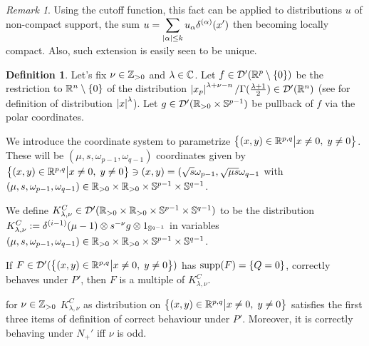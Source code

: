 \documentclass[10pt]{article} %
\newcommand{\D}{\mathcal{D}}
\theoremstyle{definition}
\newtheorem{mydef}{Definition}[section]
\theoremstyle{remark}
\newtheorem*{remark}{Remark}
\begin{document}
\begin{remark}
	Using the cutoff function, this fact can be applied to distributions $u$ of non-compact support, the sum 
	$u=\sum_{\myabs{\alpha}\leq k}u_{\alpha}\delta^{(\alpha)}(x')$
	then becoming locally compact. Also, such extension is easily seen to be unique.
\end{remark}
\begin{mydef}
	Let's fix $\nu\in\mathbb{Z}_{>0}$ and $\lambda\in\mathbb{C}$. Let $f\in\D'(\R^p\setminus\left\{ 0 \right\})$ be the restriction to 
	$\mathbb{R}^n\setminus\left\{ 0 \right\}$ of the distribution $\myabs{x_p}^{\lambda+\nu-n}/\Gamma(\frac{\lambda+1}{2})\in\D'(\R^n)$
	(see \cite[ch. III, sec. 3.2, 3.3]{gelfand1980distribution} for definition of distribution $\left|x\right|^\lambda$).
	Let $g\in\D'(\R_{>0}\times\Sp^{p-1})$ be pullback of $f$ via the polar coordinates.

	We introduce the coordinate system to parametrize $\left\{(x,y)\in\mathbb{R}^{p,q}\big| x\neq0,\;y\neq0\right\}$.
	These will be $(\mu,s,\omega_{p-1},\omega_{q-1})$ coordinates given by $\left\{(x,y)\in\mathbb{R}^{p,q}\big| 
	x\neq0,\;y\neq0\right\}\ni(x,y)=(\sqrt{s}\omega_{p-1},\sqrt{\mu s}\omega_{q-1}$ with $(\mu,s,\omega_{p-1},\omega_{q-1})\in
	\mathbb{R}_{>0}\times\mathbb{R}_{>0}\times \mathbb{S}^{p-1}\times\mathbb{S}^{q-1}$.

	We define $K^C_{\lambda,\nu}\in\D'(\R_{>0}\times\R_{>0}\times\Sp^{p-1}\times\Sp^{q-1})$ to be the distribution
	$K^C_{\lambda,\nu}:=\delta^{(i-1)}(\mu-1)\otimes s^{-\nu}g\otimes 1_{\mathbb{S}^{q-1}}
	$ in variables $(\mu,s,\omega_{p-1},\omega_{q-1})\in\mathbb{R}_{>0}\times\mathbb{R}_{>0}\times\mathbb{S}^{p-1}\times\mathbb{S}^{q-1}$.
\end{mydef}
\begin{mylem}
	\label{lem:sing_q_6}
	If $F\in\D'(\Upp)$ has $\operatorname{supp}(F)=\left\{ Q=0 \right\}$, correctly behaves under $P'$,
	then $F$ is a multiple of $K^C_{\lambda,\nu}$.
\end{mylem}
\begin{mylem}
	\label{lem:sing_q_7}
	for $\nu\in\mathbb{Z}_{>0}$
	$K^C_{\lambda,\nu}$ as distribution on $\left\{(x,y)\in\mathbb{R}^{p,q}\big| x\neq0,\;y\neq0\right\}$ satisfies the first three items of definition of correct behaviour under $P'$.
	Moreover, it
	is correctly behaving under $N_+'$ iff $\nu$ is odd.
\end{mylem}
\end{document}
